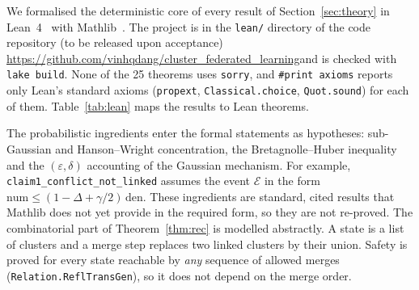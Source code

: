 We formalised the deterministic core of every result of Section~\ref{sec:theory} in Lean~4~\citep{moura2021lean4} with Mathlib~\citep{mathlib2020}. The project is in the \texttt{lean/} directory of the code repository\ifanon{} (to be released upon acceptance)\else{} \url{https://github.com/vinhqdang/cluster_federated_learning}\fi and is checked with \texttt{lake build}. None of the 25 theorems uses \texttt{sorry}, and \texttt{\#print axioms} reports only Lean's standard axioms (\texttt{propext}, \texttt{Classical.choice}, \texttt{Quot.sound}) for each of them. Table~\ref{tab:lean} maps the results to Lean theorems.

The probabilistic ingredients enter the formal statements as hypotheses: sub-Gaussian and Hanson--Wright concentration, the Bretagnolle--Huber inequality and the $(\varepsilon,\delta)$ accounting of the Gaussian mechanism. For example, \texttt{claim1\_conflict\_not\_linked} assumes the event $\mathcal E$ in the form $\mathrm{num}\le(1-\Delta+\gamma/2)\,\mathrm{den}$. These ingredients are standard, cited results that Mathlib does not yet provide in the required form, so they are not re-proved. The combinatorial part of Theorem~\ref{thm:rec} is modelled abstractly. A state is a list of clusters and a merge step replaces two linked clusters by their union. Safety is proved for every state reachable by \emph{any} sequence of allowed merges (\texttt{Relation.ReflTransGen}), so it does not depend on the merge order.

